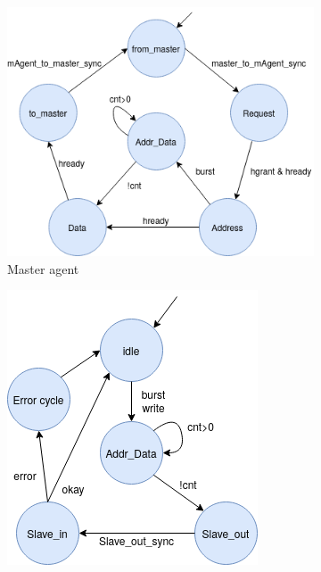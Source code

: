 \begin{figure}[hbt]
 \centering
 \begin{subfigure}[b]{0.3\linewidth}
 \includegraphics[width=\linewidth]{figs/hw/mAgent_burstfsm.png}
 \caption{Master agent}
 \end{subfigure}
 \begin{subfigure}[b]{0.3\linewidth}
 \includegraphics[width=\linewidth]{figs/hw/sAgent_wburstfsm.png}

\end{subfigure}
\end{figure}
